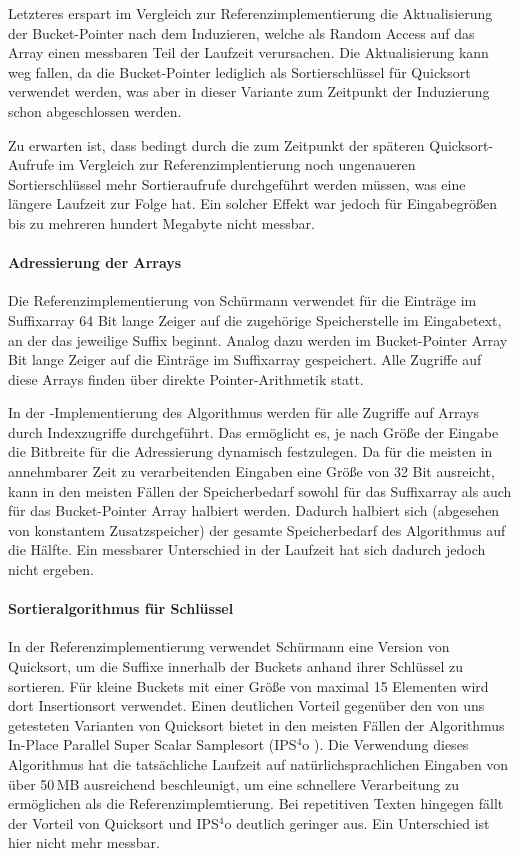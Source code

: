 Letzteres erspart im Vergleich zur Referenzimplementierung die Aktualisierung der Bucket-Pointer nach dem Induzieren, welche als Random Access auf das Array einen messbaren Teil der Laufzeit verursachen. Die Aktualisierung kann weg fallen, da die Bucket-Pointer lediglich als Sortierschlüssel für Quicksort verwendet werden, was aber in dieser Variante zum Zeitpunkt der Induzierung schon abgeschlossen werden.\par
Zu erwarten ist, dass bedingt durch die zum Zeitpunkt der späteren Quicksort-Aufrufe im Vergleich zur Referenzimplentierung noch ungenaueren Sortierschlüssel mehr Sortieraufrufe durchgeführt werden müssen, was eine längere Laufzeit zur Folge hat. Ein solcher Effekt war jedoch für Eingabegrößen bis zu mehreren hundert Megabyte nicht messbar.

\paragraph{Adressierung der Arrays}
Die Referenzimplementierung von Schürmann verwendet für die Einträge im Suffixarray 64 Bit lange Zeiger auf die zugehörige Speicherstelle im Eingabetext, an der das jeweilige Suffix beginnt. Analog dazu werden im Bucket-Pointer Array  Bit lange Zeiger auf die Einträge im Suffixarray gespeichert. Alle Zugriffe auf diese Arrays finden über direkte Pointer-Arithmetik statt.\par
In der \sacabench-Implementierung des Algorithmus werden für alle Zugriffe auf Arrays durch Indexzugriffe durchgeführt. Das ermöglicht es, je nach Größe der Eingabe die Bitbreite für die Adressierung dynamisch festzulegen. Da für die meisten in annehmbarer Zeit zu verarbeitenden Eingaben eine Größe von 32 Bit ausreicht, kann in den meisten Fällen der Speicherbedarf sowohl für das Suffixarray als auch für das Bucket-Pointer Array halbiert werden. Dadurch halbiert sich (abgesehen von konstantem Zusatzspeicher) der gesamte Speicherbedarf des Algorithmus auf die Hälfte. Ein messbarer Unterschied in der Laufzeit hat sich dadurch jedoch nicht ergeben.

\paragraph{Sortieralgorithmus für Schlüssel}
In der Referenzimplementierung verwendet Schürmann eine Version von Quicksort, um die Suffixe innerhalb der Buckets anhand ihrer Schlüssel zu sortieren. Für kleine Buckets mit einer Größe von maximal 15 Elementen wird dort Insertionsort verwendet. Einen deutlichen Vorteil gegenüber den von uns getesteten Varianten von Quicksort bietet in den meisten Fällen der Algorithmus In-Place Parallel Super Scalar Samplesort (IPS\(^4\)o \cite{axtmann2017}). Die Verwendung dieses Algorithmus hat die tatsächliche Laufzeit auf natürlichsprachlichen Eingaben von über 50\,MB ausreichend beschleunigt, um eine schnellere Verarbeitung zu ermöglichen als die Referenzimplemtierung. Bei repetitiven Texten hingegen fällt der Vorteil von Quicksort und IPS\(^4\)o deutlich geringer aus. Ein Unterschied ist hier nicht mehr messbar.
